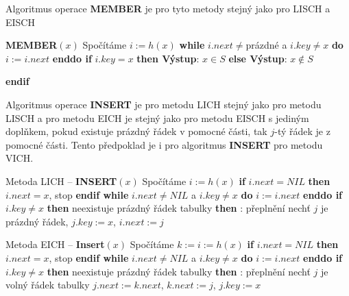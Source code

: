 \documentclass[a4paper,12pt]{article}
\begin{document}
Algoritmus operace {\bf MEMBER} je pro tyto metody 
stejný jako pro LISCH a EISCH


{\bf MEMBER$(x)$}\newline 
Spočítáme $i:=h(x)$\newline 
{\bf while} $i.next\ne$prázdné a $i.key\ne x$ {\bf do} $i:=i.
next$ {\bf enddo\newline 
if} $i.key=x$ {\bf then Výstup}: $x\in S$ {\bf else Výstup}: $
x\notin S$ {\bf endif

}
Algoritmus operace {\bf INSERT} je pro metodu LICH stejný 
jako pro metodu LISCH a pro metodu EICH je stejný jako 
pro metodu EISCH s jediným doplňkem, pokud existuje 
prázdný řádek v pomocné části, tak $j$-tý řádek je z 
pomocné části. Tento předpoklad je i pro algoritmus 
{\bf INSERT} pro metodu VICH.


Metoda LICH -- {\bf INSERT$(x)$}\newline 
Spočítáme $i:=h(x)$\newline 
{\bf if} $i.next=NIL$ {\bf then} $i.next=x$, stop {\bf endif\newline 
while} $i.next\ne NIL$ a $i.key\ne x$ {\bf do} $i:=i.next$ {\bf enddo\newline 
if} $i.key\ne x$ {\bf then}\newline 
\phantom{---}{\bf if} neexistuje prázdný řádek tabulky {\bf then}\newline 
\phantom{------}{\bf Výstup}: přeplnění\newline 
\phantom{---}{\bf else}\newline 
\phantom{------}nechť $j$ je prázdný řádek, $j
.key:=x$, $i.next:=j$\newline 
\phantom{---}{\bf endif\newline 
endif}


Metoda EICH -- {\bf Insert$(x)$}\newline 
Spočítáme $k:=i:=h(x)$\newline 
{\bf if} $i.next=NIL$ {\bf then} $i.next=x$, stop {\bf endif\newline 
while} $i.next\ne NIL$ a $i.key\ne x$ {\bf do} $i:=i.next$ {\bf enddo\newline 
if} $i.key\ne x$ {\bf then}\newline 
\phantom{---}{\bf if} neexistuje prázdný řádek tabulky {\bf then}\newline 
\phantom{------}{\bf Výstup}: přeplnění\newline 
\phantom{---}{\bf else}\newline 
\phantom{------}nechť $j$ je volný řádek tabulky\newline 
\phantom{------}$j.next:=k.next$, $k.next:=j$, $j.key:=x$\newline 
\phantom{---}{\bf endif\newline 
endif}
\end{document}
